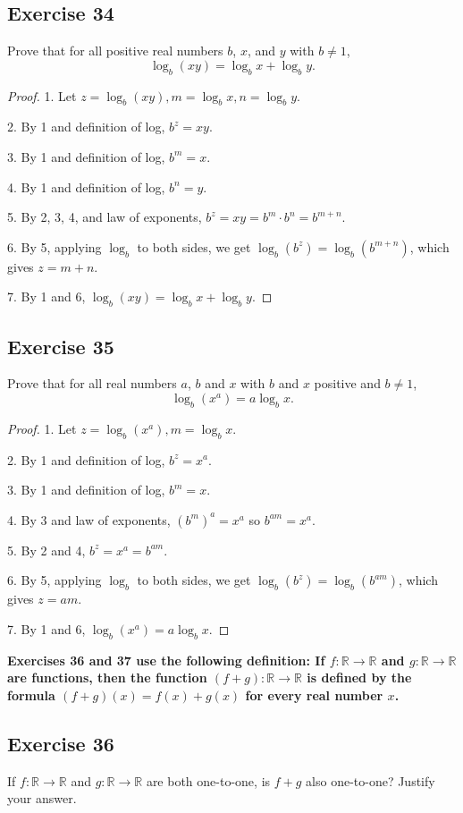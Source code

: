 \documentclass[14pt]{extarticle}
\newcommand{\R}{\mathbb{R}}
\newcommand{\cy}{\color{cyan}}
\begin{document}
\subsection{Exercise 34}
Prove that for all positive real numbers $b$, $x$, and $y$ with \(b \neq 1\),
\[
\log_b(xy) = \log_b x + \log_b y.
\]
\begin{proof}
1. Let \(z = \log_b(xy), m = \log_b x, n = \log_b y\).

2. By 1 and definition of log, \(b^z = xy\).

3. By 1 and definition of log, \(b^m = x\).

4. By 1 and definition of log, \(b^n = y\).

5. By 2, 3, 4, and law of exponents, \(b^z = xy = b^m \cdot b^n = b^{m+n}\).

6. By 5, applying $\log_b$ to both sides, we get \(\log_b(b^z) = \log_b(b^{m+n})\), which gives $z = m+n$.

7. By 1 and 6, \(\log_b(xy) = \log_b x + \log_b y\).
\end{proof}

\subsection{Exercise 35}
Prove that for all real numbers $a$, $b$ and $x$ with $b$ and $x$ positive and \(b \neq 1\),
\[
\log_b (x^a) = a \log_b x.
\]
\begin{proof}
1. Let \(z = \log_b(x^a), m = \log_b x\).

2. By 1 and definition of log, \(b^z = x^a\).

3. By 1 and definition of log, \(b^m = x\).

4. By 3 and law of exponents, \((b^m)^a = x^a\) so \(b^{am} = x^a\).

5. By 2 and 4, \(b^z = x^a = b^{am}\).

6. By 5, applying $\log_b$ to both sides, we get \(\log_b(b^z) = \log_b(b^{am})\), which gives $z = am$.

7. By 1 and 6, \(\log_b(x^a) = a \log_b x\).
\end{proof}

{\bf \cy Exercises 36 and 37 use the following definition: If \(f: \R \to \R\) and \(g: \R \to \R\) are functions, 
then the function \((f + g): \R \to \R\) is defined by the formula \((f + g)(x) = f(x) + g(x)\) for every real number $x$.}

\subsection{Exercise 36}
If \(f: \R \to \R\) and \(g: \R \to \R\) are both one-to-one, is \(f + g\) also one-to-one? Justify your answer.
\end{document}
